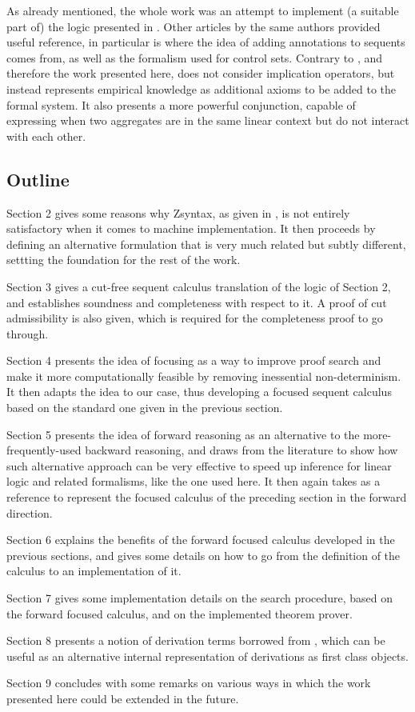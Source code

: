 As already mentioned, the whole work was an attempt to implement (a suitable
part of) the logic presented in \cite{adding-logic}.  Other articles by the same
authors provided useful reference, in particular \cite{non-mono} is where the
idea of adding annotations to sequents comes from, as well as the formalism used
for control sets.  Contrary to \cite{adding-logic}, and therefore the work
presented here, \cite{non-mono} does not consider implication operators, but
instead represents empirical knowledge as additional axioms to be added to the
formal system. It also presents a more powerful conjunction, capable of
expressing when two aggregates are in the same linear context but do not
interact with each other.

\subsection{Outline}

Section 2 gives some reasons why Zsyntax, as given in \cite{adding-logic}, is
not entirely satisfactory when it comes to machine implementation. It then
proceeds by defining an alternative formulation that is very much related but
subtly different, settting the foundation for the rest of the work.

Section 3 gives a cut-free sequent calculus translation of the logic of Section
2, and establishes soundness and completeness with respect to it. A proof of cut
admissibility is also given, which is required for the completeness proof to go
through.

Section 4 presents the idea of focusing as a way to improve proof search and
make it more computationally feasible by removing inessential
non-determinism. It then adapts the idea to our case, thus developing a focused
sequent calculus based on the standard one given in the previous section.

Section 5 presents the idea of forward reasoning as an alternative to the
more-frequently-used backward reasoning, and draws from the literature to show
how such alternative approach can be very effective to speed up inference for
linear logic and related formalisms, like the one used here.  It then again
takes \cite{chaudhuri-thesis} as a reference to represent the focused calculus
of the preceding section in the forward direction.

Section 6 explains the benefits of the forward focused calculus developed in the
previous sections, and gives some details on how to go from the definition of
the calculus to an implementation of it.

Section 7 gives some implementation details on the search procedure, based on
the forward focused calculus, and on the implemented theorem prover.

Section 8 presents a notion of derivation terms borrowed from
\cite{chaudhuri-thesis}, which can be useful as an alternative internal
representation of derivations as first class objects.

Section 9 concludes with some remarks on various ways in which the work
presented here could be extended in the future.

